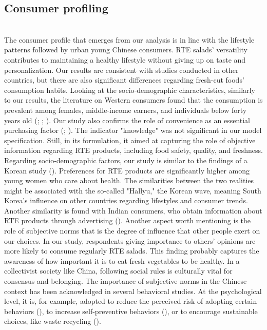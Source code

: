 \documentclass[a4,12pt]{article}
\begin{document}
\subsection{Consumer profiling}
\\
The consumer profile that emerges from our analysis is in line with the lifestyle patterns followed by urban young Chinese consumers. RTE salads' versatility contributes to maintaining a healthy lifestyle without giving up on taste and personalization.
Our results are consistent with studies conducted in other countries, but there are also significant differences regarding fresh-cut foods' consumption habits. 
Looking at the socio-demographic characteristics, similarly to our results, the literature on Western consumers found that the consumption is prevalent among females, middle-income earners, and individuals below forty years old (\cite{Massaglia19}; \cite{Sgroi18}; \cite{VanLoo10}). 
Our study also confirms the role of convenience as an essential purchasing factor (\cite{Stiletto20}; \cite{Vidal13}). The indicator "knowledge" was not significant in our model specification. Still, in its formulation, it aimed at capturing the role of objective information regarding RTE products, including food safety, quality, and freshness.
Regarding socio-demographic factors, our study is similar to the findings of a Korean study (\cite{Bae10}). Preferences for RTE products are significantly higher among young women who care about health. The similarities between the two realities might be associated with the so-called "Hallyu," the Korean wave, meaning South Korea's influence on other countries regarding lifestyles and consumer trends.
Another similarity is found with Indian consumers, who obtain information about RTE products through advertising (\cite{Hirekenchanagoudar08}). Another aspect worth mentioning is the role of subjective norms that is the degree of influence that other people exert on our choices. In our study, respondents giving importance to others' opinions are more likely to consume regularly RTE salads. This finding probably captures the awareness of how important it is to eat fresh vegetables to be healthy. In a collectivist society like China, following social rules is culturally vital for consensus and belonging. The importance of subjective norms in the Chinese context has been acknowledged in several behavioral studies. At the psychological level, it is, for example, adopted to reduce the perceived risk of adopting certain behaviors (\cite{Zhong21}), to increase self-preventive behaviors (\cite{Si21}), or to encourage sustainable choices, like waste recycling (\cite{Zhang15}).
\end{document}
